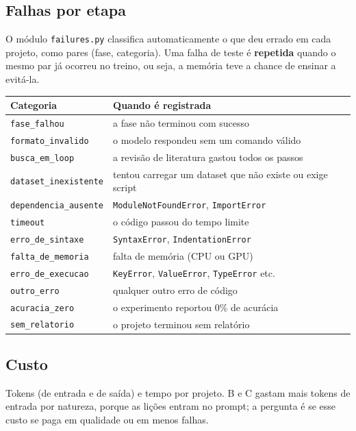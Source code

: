 \documentclass[11pt,a4paper]{article}
\begin{document}
\subsection{Falhas por etapa}

O módulo \texttt{failures.py} classifica automaticamente o que deu errado em cada projeto, como
pares (fase, categoria). Uma falha de teste é \textbf{repetida} quando o mesmo par já ocorreu
no treino, ou seja, a memória teve a chance de ensinar a evitá-la.

\begin{center}
\small
\begin{tabularx}{\textwidth}{lX}
\toprule
Categoria & Quando é registrada \\
\midrule
\texttt{fase\_falhou} & a fase não terminou com sucesso \\
\texttt{formato\_invalido} & o modelo respondeu sem um comando válido \\
\texttt{busca\_em\_loop} & a revisão de literatura gastou todos os passos \\
\texttt{dataset\_inexistente} & tentou carregar um dataset que não existe ou exige script \\
\texttt{dependencia\_ausente} & \texttt{ModuleNotFoundError}, \texttt{ImportError} \\
\texttt{timeout} & o código passou do tempo limite \\
\texttt{erro\_de\_sintaxe} & \texttt{SyntaxError}, \texttt{IndentationError} \\
\texttt{falta\_de\_memoria} & falta de memória (CPU ou GPU) \\
\texttt{erro\_de\_execucao} & \texttt{KeyError}, \texttt{ValueError}, \texttt{TypeError} etc. \\
\texttt{outro\_erro} & qualquer outro erro de código \\
\texttt{acuracia\_zero} & o experimento reportou 0\% de acurácia \\
\texttt{sem\_relatorio} & o projeto terminou sem relatório \\
\bottomrule
\end{tabularx}
\end{center}

\subsection{Custo}

Tokens (de entrada e de saída) e tempo por projeto. B e C gastam mais tokens de entrada por
natureza, porque as lições entram no prompt; a pergunta é se esse custo se paga em qualidade
ou em menos falhas.
\end{document}
